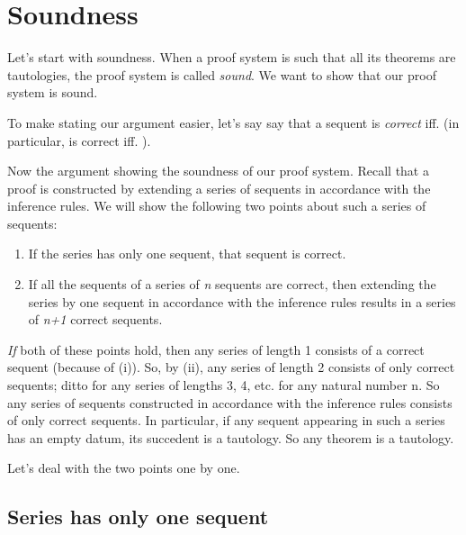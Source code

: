\section{Soundness}\label{sec:soundnessSL}



Let's start with soundness. When a proof system is such that all its theorems 
are tautologies,  the proof system is called \emph{sound}. We want to show that 
our proof system is sound.

To make stating our argument easier, let's say say that a sequent  is \emph{correct} iff.  (in particular,  is correct iff. ).



Now the argument showing the soundness of our proof system. Recall that a proof 
is constructed by extending a series of sequents in accordance with the 
inference rules.  We will show the following two points about such a series of 
sequents:

\begin{enumerate}\renewcommand{\labelenumi}{(\roman{enumi})}

 \item If the series has only one sequent, that sequent is correct.

 \item If all the sequents of a series of \emph{n} sequents are correct, 
  then extending the series by one sequent in accordance with the inference 
  rules results in a series of \emph{n+1} correct sequents.

\end{enumerate}

\emph{If} both of these points hold, then any series of length 1 consists of a 
correct sequent (because of (i)). So, by (ii), any series of length 2 consists 
of only correct sequents; ditto for any series of lengths 3, 4, etc. for any 
natural number n. So any series of sequents constructed in accordance with the 
inference rules consists of only correct sequents. In particular, if any sequent 
appearing in such a series has an empty datum, its succedent is a tautology. So 
any theorem is a tautology.

Let's deal with the two points one by one. 

\subsection{Series has only one sequent}

